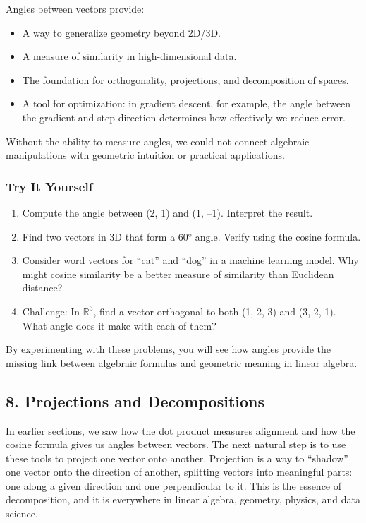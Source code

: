\documentclass[
  letterpaper,
  DIV=11,
  numbers=noendperiod]{scrreprt}
\providecommand{\tightlist}{%
  \setlength{\itemsep}{0pt}\setlength{\parskip}{0pt}}
\begin{document}
Angles between vectors provide:

\begin{itemize}
\tightlist
\item
  A way to generalize geometry beyond 2D/3D.
\item
  A measure of similarity in high-dimensional data.
\item
  The foundation for orthogonality, projections, and decomposition of
  spaces.
\item
  A tool for optimization: in gradient descent, for example, the angle
  between the gradient and step direction determines how effectively we
  reduce error.
\end{itemize}

Without the ability to measure angles, we could not connect algebraic
manipulations with geometric intuition or practical applications.

\subsubsection{Try It Yourself}\label{try-it-yourself-6}

\begin{enumerate}
\def\labelenumi{\arabic{enumi}.}
\tightlist
\item
  Compute the angle between (2, 1) and (1, --1). Interpret the result.
\item
  Find two vectors in 3D that form a 60° angle. Verify using the cosine
  formula.
\item
  Consider word vectors for ``cat'' and ``dog'' in a machine learning
  model. Why might cosine similarity be a better measure of similarity
  than Euclidean distance?
\item
  Challenge: In \(\mathbb{R}^3\), find a vector orthogonal to both (1,
  2, 3) and (3, 2, 1). What angle does it make with each of them?
\end{enumerate}

By experimenting with these problems, you will see how angles provide
the missing link between algebraic formulas and geometric meaning in
linear algebra.

\subsection{8. Projections and
Decompositions}\label{projections-and-decompositions}

In earlier sections, we saw how the dot product measures alignment and
how the cosine formula gives us angles between vectors. The next natural
step is to use these tools to project one vector onto another.
Projection is a way to ``shadow'' one vector onto the direction of
another, splitting vectors into meaningful parts: one along a given
direction and one perpendicular to it. This is the essence of
decomposition, and it is everywhere in linear algebra, geometry,
physics, and data science.
\end{document}
